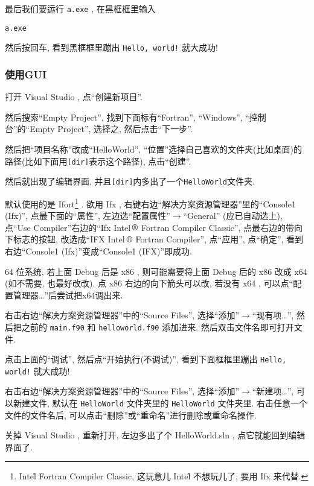 最后我们要运行 \texttt{a.exe} , 在黑框框里输入
\begin{verbatim}
a.exe
\end{verbatim}
然后按回车, 看到黑框框里蹦出 \texttt{Hello, world!} 就大成功!

\subsubsection{使用GUI}

打开 Visual Studio , 点``创建新项目''.

然后搜索``Empty Project'', 找到下面标有``Fortran'', ``Windows'', ``控制台''的``Empty Project'', 选择之, 然后点击``下一步''.

然后把``项目名称''改成``HelloWorld'', ``位置''选择自己喜欢的文件夹(比如桌面)的路径(比如下面用\texttt{[dir]}表示这个路径), 点击``创建''.

然后就出现了编辑界面, 并且\texttt{[dir]}内多出了一个\texttt{HelloWorld}文件夹.

默认使用的是 Ifort\footnote{Intel\r{} Fortran Compiler Classic, 这玩意儿 Intel\r{} 不想玩儿了, 要用 Ifx 来代替.} . 欲用 Ifx , 右键右边``解决方案资源管理器''里的``Console1 (Ifx)'', 点最下面的``属性'', 左边选``配置属性''$\rightarrow$``General'' (应已自动选上), 点``Use Compiler''右边的``Ifx Intel$\,\text{\textregistered}$ Fortran Compiler Classic'', 点最右边的带向下标志的按钮, 改选成``IFX Intel$\,\text{\textregistered}$ Fortran Compiler'', 点``应用'', 点``确定'', 看到右边``Console1 (Ifx)''变成``Console1 (IFX)''即成功.

64 位系统, 若上面 Debug 后是 x86 , 则可能需要将上面 Debug 后的 x86 改成 x64 (如不需要, 也最好改改). 点 x86 右边的向下箭头可以改, 若没有 x64 , 可以点``配置管理器\dots''后尝试把x64调出来.

右击右边``解决方案资源管理器''中的``Source Files'', 选择``添加''$\rightarrow$``现有项\dots'', 然后把之前的 \texttt{main.f90} 和 \texttt{helloworld.f90} 添加进来. 然后双击文件名即可打开文件.

点击上面的``调试'', 然后点``开始执行(不调试)'', 看到下面框框里蹦出 \texttt{Hello, world!} 就大成功!

右击右边``解决方案资源管理器''中的``Source Files'', 选择``添加''$\rightarrow$``新建项\dots'', 可以新建文件, 默认在 \texttt{HelloWorld} 文件夹里的 \texttt{HelloWorld} 文件夹里. 右击任意一个文件的文件名后, 可以点击``删除''或``重命名''进行删除或重命名操作.

关掉 Visual Studio , 重新打开, 左边多出了个 HelloWorld.sln , 点它就能回到编辑界面了.

